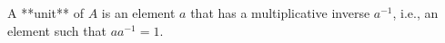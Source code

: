 A **unit** of $A$ is an element $a$ that has a multiplicative inverse $a^{-1}$, i.e., an element such that $a a^{-1} = 1$.
